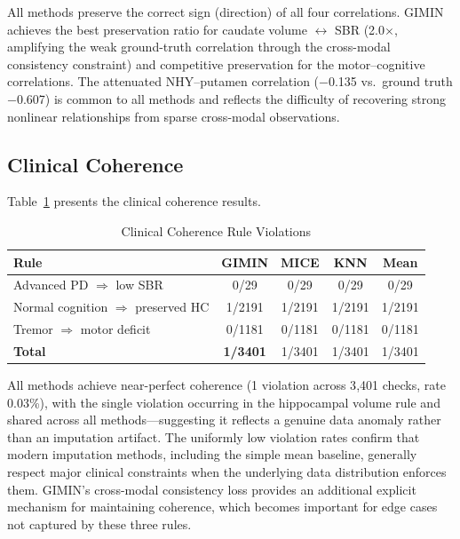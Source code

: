 \documentclass[journal,twoside,web]{ieeecolor}
\begin{document}
All methods preserve the correct sign (direction) of all four correlations. GIMIN achieves the best preservation ratio for caudate volume $\leftrightarrow$ SBR (2.0$\times$, amplifying the weak ground-truth correlation through the cross-modal consistency constraint) and competitive preservation for the motor--cognitive correlations. The attenuated NHY--putamen correlation ($-$0.135 vs.\ ground truth $-$0.607) is common to all methods and reflects the difficulty of recovering strong nonlinear relationships from sparse cross-modal observations.

\subsection{Clinical Coherence}

Table~\ref{tab:coherence} presents the clinical coherence results.

\begin{table}[t]
\centering
\caption{Clinical Coherence Rule Violations}
\label{tab:coherence}
\begin{tabular}{lcccc}
\toprule
\textbf{Rule} & \textbf{GIMIN} & \textbf{MICE} & \textbf{KNN} & \textbf{Mean} \\
\midrule
Advanced PD $\Rightarrow$ low SBR         & 0/29   & 0/29   & 0/29   & 0/29 \\
Normal cognition $\Rightarrow$ preserved HC & 1/2191 & 1/2191 & 1/2191 & 1/2191 \\
Tremor $\Rightarrow$ motor deficit        & 0/1181 & 0/1181 & 0/1181 & 0/1181 \\
\midrule
\textbf{Total}                            & \textbf{1/3401} & 1/3401 & 1/3401 & 1/3401 \\
\bottomrule
\end{tabular}
\end{table}

All methods achieve near-perfect coherence (1 violation across 3{,}401 checks, rate 0.03\%), with the single violation occurring in the hippocampal volume rule and shared across all methods---suggesting it reflects a genuine data anomaly rather than an imputation artifact. The uniformly low violation rates confirm that modern imputation methods, including the simple mean baseline, generally respect major clinical constraints when the underlying data distribution enforces them. GIMIN's cross-modal consistency loss provides an additional explicit mechanism for maintaining coherence, which becomes important for edge cases not captured by these three rules.
\end{document}
